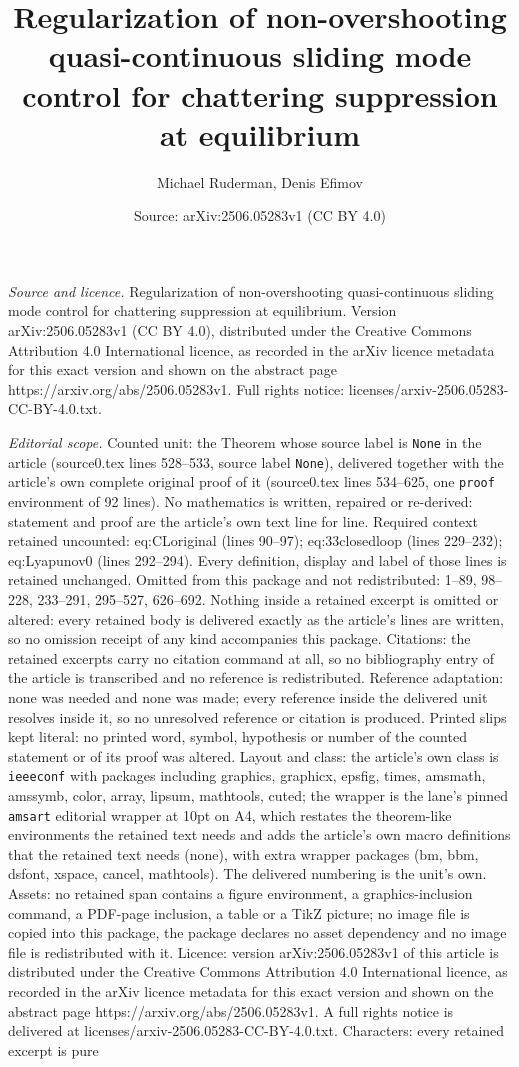 \documentclass[10pt,a4paper]{amsart}
\title[Regularization of non-overshooting quasi-continuous sliding ]{Regularization of non-overshooting quasi-continuous sliding mode control for chattering suppression at equilibrium}
\author{Michael Ruderman, Denis Efimov}
\date{Source: arXiv:2506.05283v1 (CC BY 4.0)}
\begin{document}
\maketitle

\noindent\emph{Source and licence.} Regularization of non-overshooting quasi-continuous sliding mode control for chattering suppression at equilibrium. Version arXiv:2506.05283v1 (CC BY 4.0), distributed under the Creative Commons Attribution 4.0 International licence, as recorded in the arXiv licence metadata for this exact version and shown on the abstract page https://arxiv.org/abs/2506.05283v1. Full rights notice: licenses/arxiv-2506.05283-CC-BY-4.0.txt.\par\smallskip

\noindent\textit{Editorial scope.} Counted unit: the Theorem whose source label is \texttt{None} in the article (source0.tex lines 528--533, source label \texttt{None}), delivered together with the article's own complete original proof of it (source0.tex lines 534--625, one \texttt{proof} environment of 92 lines). No mathematics is written, repaired or re-derived: statement and proof are the article's own text line for line. Required context retained uncounted: eq:CLoriginal (lines 90--97); eq:33closedloop (lines 229--232); eq:Lyapunov0 (lines 292--294). Every definition, display and label of those lines is retained unchanged. Omitted from this package and not redistributed: 1--89, 98--228, 233--291, 295--527, 626--692. Nothing inside a retained excerpt is omitted or altered: every retained body is delivered exactly as the article's lines are written, so no omission receipt of any kind accompanies this package. Citations: the retained excerpts carry no citation command at all, so no bibliography entry of the article is transcribed and no reference is redistributed. Reference adaptation: none was needed and none was made; every reference inside the delivered unit resolves inside it, so no unresolved reference or citation is produced. Printed slips kept literal: no printed word, symbol, hypothesis or number of the counted statement or of its proof was altered. Layout and class: the article's own class is \texttt{ieeeconf} with packages including graphics, graphicx, epsfig, times, amsmath, amssymb, color, array, lipsum, mathtools, cuted; the wrapper is the lane's pinned \texttt{amsart} editorial wrapper at 10pt on A4, which restates the theorem-like environments the retained text needs and adds the article's own macro definitions that the retained text needs (none), with extra wrapper packages (bm, bbm, dsfont, xspace, cancel, mathtools). The delivered numbering is the unit's own. Assets: no retained span contains a figure environment, a graphics-inclusion command, a PDF-page inclusion, a table or a TikZ picture; no image file is copied into this package, the package declares no asset dependency and no image file is redistributed with it. Licence: version arXiv:2506.05283v1 of this article is distributed under the Creative Commons Attribution 4.0 International licence, as recorded in the arXiv licence metadata for this exact version and shown on the abstract page https://arxiv.org/abs/2506.05283v1. A full rights notice is delivered at licenses/arxiv-2506.05283-CC-BY-4.0.txt. Characters: every retained excerpt is pure 
\end{document}
